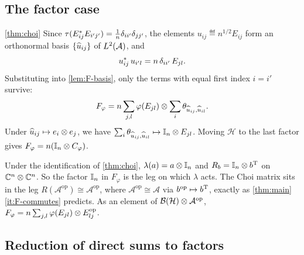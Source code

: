 \documentclass[12pt]{article}
\newcommand{\alg}{\mathcal{A}}             %
\newcommand{\hilb}{\mathcal{H}}            %
\newcommand{\bdd}[1]{\mathcal{B}\br{#1}}   %
\newcommand{\op}{^{\mathrm{op}}}           %
\newcommand{\rankone}[2]{\theta_{#1, #2}}  %
\newcommand{\Ltwo}{L^2\br{\alg}}           %
\newcommand{\vect}[1]{\widehat{#1}}        %
\newcommand{\Fphi}{F_{\varphi}}            %
\newcommand{\Choi}{C_{\varphi}}            %
\begin{document}
\subsection{The factor case}
\label{sec:choi-factor}

\begin{proofof}{\cref{thm:choi}}
Since \(\tau(E_{ij}^* E_{i'j'}) = \frac{1}{n}\delta_{ii'}\delta_{jj'}\),
the elements \(u_{ij} \eqdef n^{1/2}E_{ij}\) form an orthonormal basis
\(\set{\vect{u}_{ij}}\) of \(\Ltwo\), and
\[
  u_{ij}^*\, u_{i'l} = n\,\delta_{ii'}\,E_{jl}.
\]
Substituting into \cref{lem:F-basis}, only the terms with equal first index
\(i = i'\) survive:
\[
  \Fphi = n \sum_{j,l} \varphi(E_{jl}) \tensor
  \sum_i \rankone{\vect{u}_{ij}}{\vect{u}_{il}}.
\]
Under \(\vect{u}_{ij} \mapsto e_i \tensor e_j\), we have
\(\sum_i \rankone{\vect{u}_{ij}}{\vect{u}_{il}} \mapsto \id_n \tensor E_{jl}\).
Moving \(\hilb\) to the last factor gives \(\Fphi = n(\id_n \tensor \Choi)\).
\end{proofof}

\begin{remark}
\label{rem:choi-consistency}
Under the identification of \cref{thm:choi}, \(\lambda(a) = a \otimes {\mathbb I}_n\) and
\(R_b = {\mathbb I}_n \otimes b^{\mathrm T}\) on \({\mathbb C}^n \otimes {\mathbb C}^n\). So the
factor \({\mathbb I}_n\) in \(\Fphi\) is the leg on which \(\lambda\) acts. The Choi
matrix sits in the leg \(R(\alg\op) \cong \alg\op\), where \(\alg\op \cong \alg\)
via \(b\op \mapsto b^\transpose\), exactly as
\cref{thm:main}\ref{it:F-commutes} predicts. As an element of
\(\bdd{\hilb} \tensor \alg\op\),
\(\Fphi = n\sum_{j,l}\varphi(E_{jl}) \tensor E_{lj}\op\).
\end{remark}

\subsection{Reduction of direct sums to factors}
\label{sec:choi-blocks}
\end{document}

